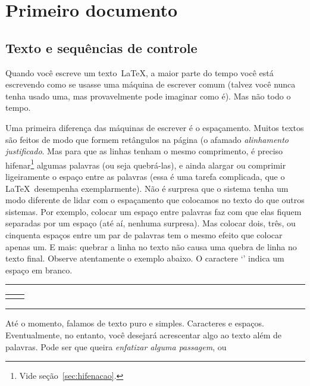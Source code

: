 \section{Primeiro documento}


\subsection{Texto e sequências de controle}\label{sec:seq-controle}

Quando você escreve um texto~\LaTeX, a maior parte do tempo você está
escrevendo como se usasse uma máquina de escrever comum (talvez você nunca tenha usado uma, mas provavelmente pode imaginar como é). Mas não todo o tempo. 

Uma primeira diferença das máquinas de escrever é o espaçamento. Muitos textos são feitos de modo que formem retângulos na página (o afamado \emph{alinhamento justificado}. Mas para que as linhas tenham o mesmo comprimento, é preciso hifenar\footnote{Vide seção~\ref{sec:hifenacao}.} algumas palavras (ou seja quebrá-las), e ainda alargar ou comprimir ligeiramente o espaço entre as palavras (essa é uma tarefa complicada, que o \LaTeX\ desempenha exemplarmente). Não é surpresa que o sistema tenha um modo diferente de lidar com o espaçamento que colocamos no texto do que outros sistemas. Por exemplo, colocar um espaço entre palavras faz com que elas fiquem separadas por um espaço (até aí, nenhuma surpresa). Mas colocar dois, três, ou cinquenta espaços entre um par de palavras tem o mesmo efeito que colocar apenas um. E mais: quebrar a linha no texto não causa uma quebra de linha no texto final. Observe atentamente o exemplo abaixo. O caractere `\texttt{\textvisiblespace}' indica um espaço em branco.

\medskip
\begin{center}\hrule\smallskip
\begin{tabular}{c|c}
\begin{minipage}{.405\textwidth}\footnotesize

\end{minipage} &
\begin{minipage}{.535\textwidth}

\end{minipage}
\end{tabular}
\smallskip\hrule
\end{center}
\medskip

Até o momento, falamos de texto puro e simples. Caracteres e espaços. Eventualmente, no entanto, você desejará acrescentar algo ao
texto além de palavras. Pode ser que queira \emph{enfatizar alguma
  passagem}, ou

